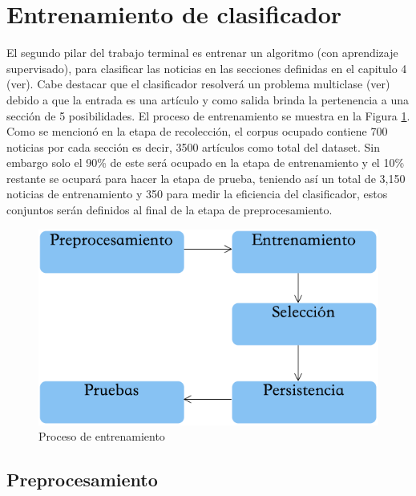 \section[Entrenamiento]{Entrenamiento de clasificador}

El segundo pilar del trabajo terminal es entrenar un algoritmo (con aprendizaje supervisado), para clasificar las noticias en las secciones definidas en el capitulo 4 (ver). Cabe destacar que el clasificador resolverá un problema multiclase (ver) debido a que la entrada es una artículo y como salida brinda la pertenencia a una sección  de 5 posibilidades. El proceso de entrenamiento se muestra en la Figura \ref{fig:cp5:procesoE}.\\

Como se mencionó en la etapa de recolección, el corpus ocupado contiene 700 noticias por cada sección es decir, 3500 artículos como total del dataset. Sin embargo solo el 90\% de este será ocupado en la etapa de entrenamiento y el 10\% restante se ocupará para hacer la etapa de prueba, teniendo así un total de 3,150 noticias de entrenamiento y 350 para medir la eficiencia del clasificador, estos conjuntos serán definidos al final de la etapa de preprocesamiento.\\

\begin{figure}[h]
\centering
\includegraphics[scale=.55]{imagenes/capitulo5/Esquema.png}
\caption{Proceso de entrenamiento}
\label{fig:cp5:procesoE}
\end{figure}


\subsection{Preprocesamiento}

